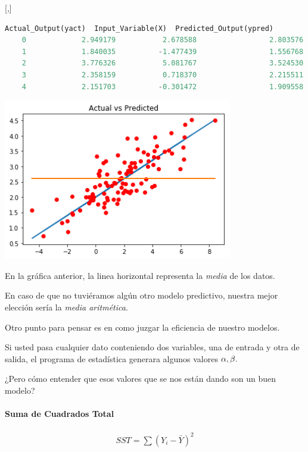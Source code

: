 [,]{} 
\begin{lstlisting}[language=Python]
	Actual_Output(yact)  Input_Variable(X)  Predicted_Output(ypred)
	0             2.949179           2.678588                 2.803576
	1             1.840035          -1.477439                 1.556768
	2             3.776326           5.081767                 3.524530
	3             2.358159           0.718370                 2.215511
	4             2.151703          -0.301472                 1.909558
\end{lstlisting}


\begin{center}
	\includegraphics[width=10cm,keepaspectratio=true]{./images/actualVsPredicted.png}
\end{center}



En la gráfica anterior, la linea horizontal representa la \emph{media} de los datos.


En caso de que no tuviéramos algún otro modelo predictivo, nuestra mejor elección sería la \emph{media aritmética}.


Otro punto para pensar es en como juzgar la eficiencia de nuestro modelos. 

Si usted pasa cualquier dato conteniendo dos variables, una de entrada y otra de salida, el programa de estadística generara algunos valores $\alpha,\beta.$



¿Pero cómo entender que esos valores que se nos están dando son un buen modelo?

\paragraph{Suma de Cuadrados Total}
\begin{align}
	SST = \sum\left( Y_{i}-\bar{Y} \right)^{2}
\end{align}

